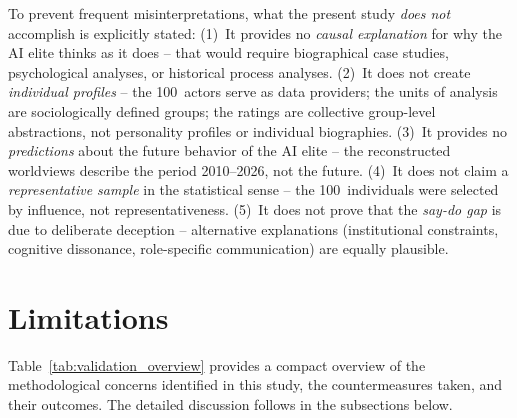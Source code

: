 \documentclass[12pt,a4paper]{article}
\begin{document}
To prevent frequent misinterpretations, what the present study \emph{does not} accomplish is explicitly stated: (1)~It provides no \emph{causal explanation} for why the AI elite thinks as it does -- that would require biographical case studies, psychological analyses, or historical process analyses. (2)~It does not create \emph{individual profiles} -- the 100~actors serve as data providers; the units of analysis are sociologically defined groups; the ratings are collective group-level abstractions, not personality profiles or individual biographies. (3)~It provides no \emph{predictions} about the future behavior of the AI elite -- the reconstructed worldviews describe the period 2010--2026, not the future. (4)~It does not claim a \emph{representative sample} in the statistical sense -- the 100~individuals were selected by influence, not representativeness. (5)~It does not prove that the \emph{say-do gap} is due to deliberate deception -- alternative explanations (institutional constraints, cognitive dissonance, role-specific communication) are equally plausible.


\section{Limitations}
\label{sec:limitationen}

Table~\ref{tab:validation_overview} provides a compact overview of the methodological concerns identified in this study, the countermeasures taken, and their outcomes. The detailed discussion follows in the subsections below.
\end{document}

